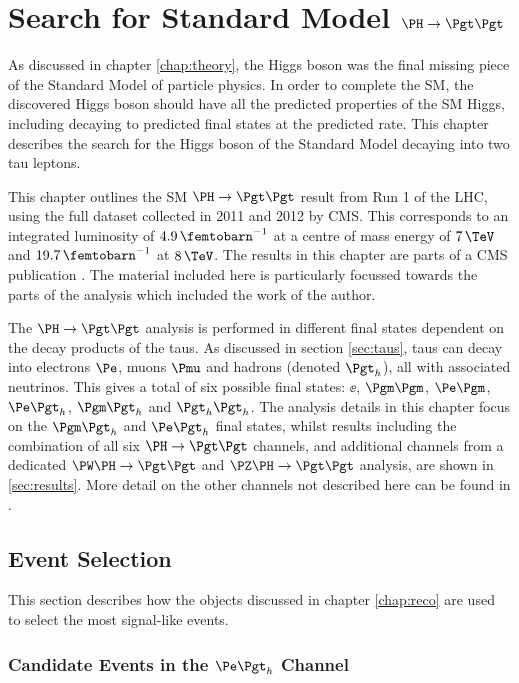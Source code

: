 \chapter{Search for Standard Model $\PH \to \Pgt\Pgt$}
\label{chap:htt-sm}

As discussed in chapter \ref{chap:theory}, the Higgs boson was the final missing 
piece of the Standard Model of particle physics. In order to complete the
\ac{SM}, the discovered Higgs boson should have all the predicted properties of the
\ac{SM} Higgs, including decaying to predicted final states at the predicted rate. This
chapter describes the search for the Higgs boson of the Standard Model 
decaying into two tau leptons.

This chapter outlines the \ac{SM} $\HToTauTau$ result from Run 1 of the \ac{LHC}, using the
full dataset collected in 2011 and 2012 by CMS. This corresponds to an
integrated luminosity of $4.9\,\femtobarn^{-1}$ at a centre of mass energy of $7\,\TeV$ and
$19.7\,\femtobarn^{-1}$ at $8\,\TeV$. The results in this chapter are parts of a CMS publication 
\cite{HIG-13-004}. The material included 
here is particularly focussed towards the parts of the analysis which 
included the work of the author. 

The $\HToTauTau$ analysis is performed in different final states dependent
on the decay products of the taus. As discussed in section
\ref{sec:taus}, taus can decay into electrons $\Pe$,
muons $\Pmu$ and hadrons (denoted $\Pgth$), all with associated neutrinos.
This gives a total of six possible final states: $\ee$, $\mumu$, $\emu$,
$\etau$, $\mutau$ and $\tautau$. The analysis details in this chapter focus on
the $\mutau$ and $\etau$ final states, whilst results including the combination of all
six $\HToTauTau$ channels, and additional channels from a dedicated $\PW\PH\to\Pgt\Pgt$ and
$\PZ\PH\to\Pgt\Pgt$ analysis, are shown in \ref{sec:results}. More detail on the other channels
not described here can be found in \cite{HIG-13-004}. 

\section{Event Selection}
\label{sec:eventSelection}

This section describes how the objects discussed in chapter
\ref{chap:reco} are used to select the most signal-like events. 

\subsection{Candidate Events in the $\etau$ Channel}

